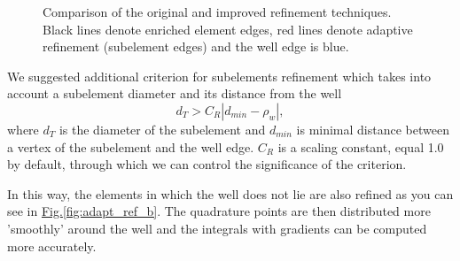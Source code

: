 \documentclass[preprint,12pt]{elsarticle}
\newcommand{\fig}[1]{\hyperref[#1]{Fig.\ref{#1}}}
\begin{document}
\begin{figure}[!htb]
  \centering    
  \hspace{0pt}
  \caption[Adaptive refinement comparison]
  {Comparison of the original and improved refinement techniques.
   Black lines denote enriched element edges, red lines denote adaptive refinement (subelement edges) and the well
   edge is blue.
  }
  \label{fig:adapt_refinement}
\end{figure}

We suggested additional criterion for subelements refinement which takes into account a subelement diameter 
and its distance from the well
\begin{equation}
  d_T > C_R|d_{min} - \rho_w|,
\end{equation}
where $d_T$ is the diameter of the subelement and $d_{min}$ is minimal distance between a vertex of 
the subelement and the well edge. $C_R$ is a scaling constant, equal 1.0 by default, through which we can 
control the significance of the criterion.

In this way, the elements in which the well does not lie are also refined as you can see in 
\fig{fig:adapt_ref_b}. The quadrature points are then distributed more 'smoothly' around the well and the
integrals with gradients can be computed more accurately. 
\end{document}
